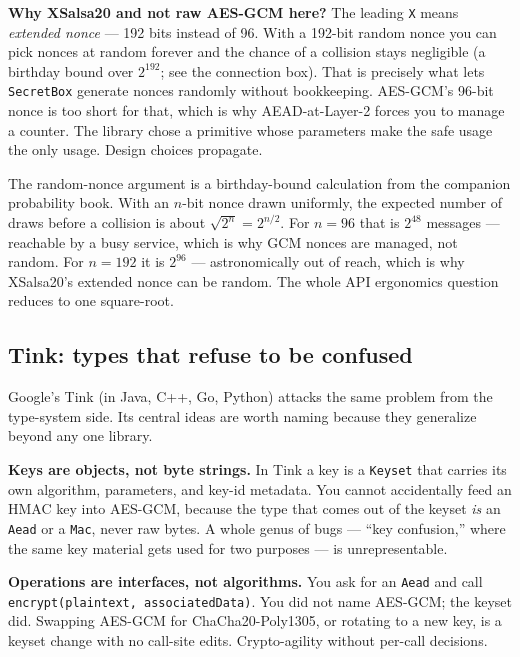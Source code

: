 \begin{focusbox}
\textbf{Why XSalsa20 and not raw AES-GCM here?} The leading \texttt{X} means
\emph{extended nonce} --- 192 bits instead of 96. With a 192-bit random nonce you
can pick nonces at random forever and the chance of a collision stays negligible
(a birthday bound over $2^{192}$; see the connection box). That is precisely what
lets \texttt{SecretBox} generate nonces randomly without bookkeeping. AES-GCM's
96-bit nonce is too short for that, which is why AEAD-at-Layer-2 forces you to
manage a counter. The library chose a primitive whose parameters make the safe
usage the only usage. Design choices propagate.
\end{focusbox}

\begin{connectionbox}
The random-nonce argument is a birthday-bound calculation from the companion
probability book. With an $n$-bit nonce drawn uniformly, the expected number of
draws before a collision is about $\sqrt{2^{n}} = 2^{n/2}$. For $n = 96$ that is
$2^{48}$ messages --- reachable by a busy service, which is why GCM nonces are
managed, not random. For $n = 192$ it is $2^{96}$ --- astronomically out of reach,
which is why XSalsa20's extended nonce can be random. The whole API ergonomics
question reduces to one square-root.
\end{connectionbox}

\subsection{Tink: types that refuse to be confused}

Google's Tink (in Java, C++, Go, Python) attacks the same problem from the
type-system side. Its central ideas are worth naming because they generalize
beyond any one library.

\textbf{Keys are objects, not byte strings.} In Tink a key is a \texttt{Keyset}
that carries its own algorithm, parameters, and key-id metadata. You cannot
accidentally feed an HMAC key into AES-GCM, because the type that comes out of the
keyset \emph{is} an \texttt{Aead} or a \texttt{Mac}, never raw bytes. A whole genus
of bugs --- ``key confusion,'' where the same key material gets used for two
purposes --- is unrepresentable.

\textbf{Operations are interfaces, not algorithms.} You ask for an \texttt{Aead}
and call \texttt{encrypt(plaintext, associatedData)}. You did not name AES-GCM; the
keyset did. Swapping AES-GCM for ChaCha20-Poly1305, or rotating to a new key, is a
keyset change with no call-site edits. Crypto-agility without per-call decisions.

